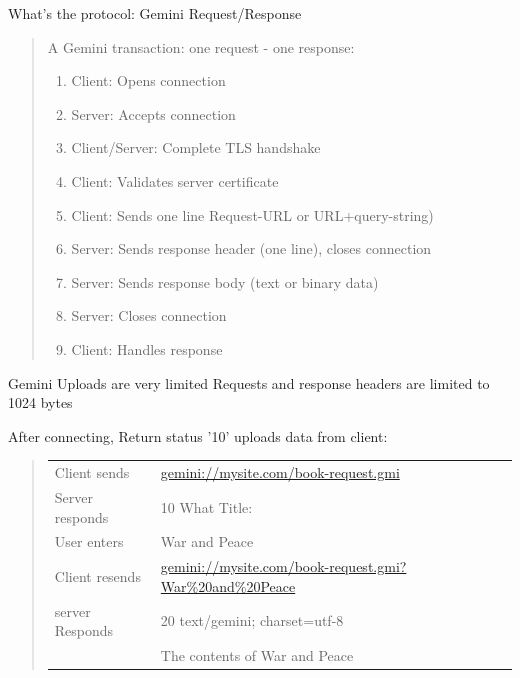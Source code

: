 \documentclass[presentation, 11pt,  aspectratio=169]{beamer}
\begin{document}
\begin{frame}[label={sec:orgfd9c50d}]{What's the protocol: Gemini Request/Response}
\begin{quote}
A Gemini transaction: one request - one response:\\

\begin{enumerate}
\item Client: Opens connection\\
\item Server: Accepts connection\\
\item Client/Server: Complete TLS handshake\\
\item Client: Validates server certificate\\
\item \alert{Client: Sends one line Request-URL or URL+query-string)}\\
\item \alert{Server: Sends response header (one line), closes connection}\\
\item \alert{Server: Sends response body (text or binary data)}\\
\item Server: Closes connection\\
\item \alert{Client: Handles response}\\
\end{enumerate}
\end{quote}
\end{frame}

\begin{frame}[label={sec:orgb6a5140}]{Gemini Uploads are very limited}
Requests and response headers are limited to 1024 bytes\\

\begin{block}{After connecting, Return status '10' uploads data from client:}
\begin{quote}
\begin{center}
\begin{tabular}{ll}
 & \\
\hline
Client sends & \alert{\href{gemini://mysite.com/book-request.gmi}{gemini://mysite.com/book-request.gmi}}\\
Server responds & \alert{10 What Title:}\\
\hline
User enters & War and Peace\\
Client resends & \alert{\href{gemini://mysite.com/book-request.gmi?War\%20and\%20Peace}{gemini://mysite.com/book-request.gmi?War\%20and\%20Peace}}\\
\hline
server Responds & \alert{20 text/gemini; charset=utf-8}\\
 & The contents of War and Peace\\
\hline
\end{tabular}
\end{center}
\end{quote}
\end{block}
\end{frame}
\end{document}
